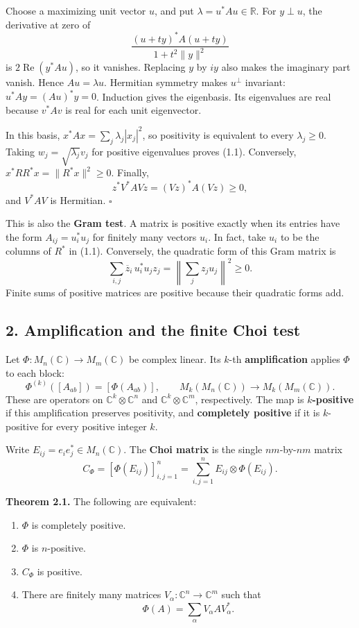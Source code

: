 \documentclass[
  11pt,
]{article}
\providecommand{\tightlist}{%
  \setlength{\itemsep}{0pt}\setlength{\parskip}{0pt}}
\begin{document}
Choose a maximizing unit vector \(u\), and put
\(\lambda=u^*Au\in\mathbb R\). For \(y\perp u\), the derivative at zero
of \[
\frac{(u+ty)^*A(u+ty)}{1+t^2\|y\|^2}
\] is \(2\operatorname{Re}(y^*Au)\), so it vanishes. Replacing \(y\) by
\(iy\) also makes the imaginary part vanish. Hence \(Au=\lambda u\).
Hermitian symmetry makes \(u^\perp\) invariant: \(u^*Ay=(Au)^*y=0\).
Induction gives the eigenbasis. Its eigenvalues are real because
\(v^*Av\) is real for each unit eigenvector.

In this basis, \(x^*Ax=\sum_j\lambda_j|x_j|^2\), so positivity is
equivalent to every \(\lambda_j\geq0\). Taking
\(w_j=\sqrt{\lambda_j}v_j\) for positive eigenvalues proves (1.1).
Conversely, \(x^*RR^*x=\|R^*x\|^2\geq0\). Finally, \[
z^*V^*AVz=(Vz)^*A(Vz)\geq0,
\] and \(V^*AV\) is Hermitian. \(\square\)

This is also the \textbf{Gram test}. A matrix is positive exactly when
its entries have the form \(A_{ij}=u_i^*u_j\) for finitely many vectors
\(u_i\). In fact, take \(u_i\) to be the columns of \(R^*\) in (1.1).
Conversely, the quadratic form of this Gram matrix is \[
\sum_{i,j}\overline z_i\,u_i^*u_jz_j
=\left\|\sum_j z_ju_j\right\|^2\geq0.
\] Finite sums of positive matrices are positive because their quadratic
forms add.

\subsection{2. Amplification and the finite Choi
test}\label{amplification-and-the-finite-choi-test}

Let \(\Phi:M_n(\mathbb C)\to M_m(\mathbb C)\) be complex linear. Its
\(k\)-th \textbf{amplification} applies \(\Phi\) to each block: \[
\Phi^{(k)}([A_{ab}])=[\Phi(A_{ab})],
\qquad
M_k(M_n(\mathbb C))\longrightarrow M_k(M_m(\mathbb C)).
\tag{2.1}
\] These are operators on \(\mathbb C^k\otimes\mathbb C^n\) and
\(\mathbb C^k\otimes\mathbb C^m\), respectively. The map is
\textbf{\(k\)-positive} if this amplification preserves positivity, and
\textbf{completely positive} if it is \(k\)-positive for every positive
integer \(k\).

Write \(E_{ij}=e_ie_j^*\in M_n(\mathbb C)\). The \textbf{Choi matrix} is
the single \(nm\)-by-\(nm\) matrix \[
C_\Phi=[\Phi(E_{ij})]_{i,j=1}^n
       =\sum_{i,j=1}^n E_{ij}\otimes\Phi(E_{ij}).
\tag{2.2}
\]

\textbf{Theorem 2.1.} The following are equivalent:

\begin{enumerate}
\def\labelenumi{\arabic{enumi}.}
\tightlist
\item
  \(\Phi\) is completely positive.
\item
  \(\Phi\) is \(n\)-positive.
\item
  \(C_\Phi\) is positive.
\item
  There are finitely many matrices
  \(V_\alpha:\mathbb C^n\to\mathbb C^m\) such that \[
  \Phi(A)=\sum_\alpha V_\alpha A V_\alpha^*.
  \tag{2.3}
  \]
\end{enumerate}
\end{document}
